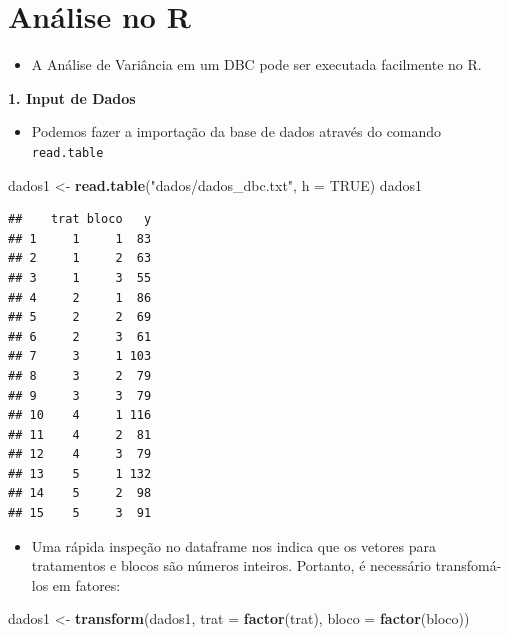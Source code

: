 \documentclass[
]{book}
\newenvironment{Shaded}{\begin{snugshade}}{\end{snugshade}}
\newcommand{\AttributeTok}[1]{\textcolor[rgb]{0.13,0.29,0.53}{#1}}
\newcommand{\ConstantTok}[1]{\textcolor[rgb]{0.56,0.35,0.01}{#1}}
\newcommand{\FunctionTok}[1]{\textcolor[rgb]{0.13,0.29,0.53}{\textbf{#1}}}
\newcommand{\NormalTok}[1]{#1}
\newcommand{\OtherTok}[1]{\textcolor[rgb]{0.56,0.35,0.01}{#1}}
\newcommand{\StringTok}[1]{\textcolor[rgb]{0.31,0.60,0.02}{#1}}
\providecommand{\tightlist}{%
  \setlength{\itemsep}{0pt}\setlength{\parskip}{0pt}}
\begin{document}
\section{Análise no R}\label{anuxe1lise-no-r}

\begin{itemize}
\tightlist
\item
  A Análise de Variância em um DBC pode ser executada facilmente no R.
\end{itemize}

\textbf{1. Input de Dados}

\begin{itemize}
\tightlist
\item
  Podemos fazer a importação da base de dados através do comando \texttt{read.table}
\end{itemize}

\begin{Shaded}
\begin{Highlighting}[]
\NormalTok{dados1 }\OtherTok{\textless{}{-}} \FunctionTok{read.table}\NormalTok{(}\StringTok{"dados/dados\_dbc.txt"}\NormalTok{, }\AttributeTok{h =} \ConstantTok{TRUE}\NormalTok{)}
\NormalTok{dados1}
\end{Highlighting}
\end{Shaded}

\begin{verbatim}
##    trat bloco   y
## 1     1     1  83
## 2     1     2  63
## 3     1     3  55
## 4     2     1  86
## 5     2     2  69
## 6     2     3  61
## 7     3     1 103
## 8     3     2  79
## 9     3     3  79
## 10    4     1 116
## 11    4     2  81
## 12    4     3  79
## 13    5     1 132
## 14    5     2  98
## 15    5     3  91
\end{verbatim}

\begin{itemize}
\tightlist
\item
  Uma rápida inspeção no dataframe nos indica que os vetores para tratamentos e blocos são números inteiros. Portanto, é necessário transfomá-los em fatores:
\end{itemize}

\begin{Shaded}
\begin{Highlighting}[]
\NormalTok{dados1 }\OtherTok{\textless{}{-}} \FunctionTok{transform}\NormalTok{(dados1, }\AttributeTok{trat =} \FunctionTok{factor}\NormalTok{(trat), }\AttributeTok{bloco =} \FunctionTok{factor}\NormalTok{(bloco))}
\end{Highlighting}
\end{Shaded}
\end{document}
